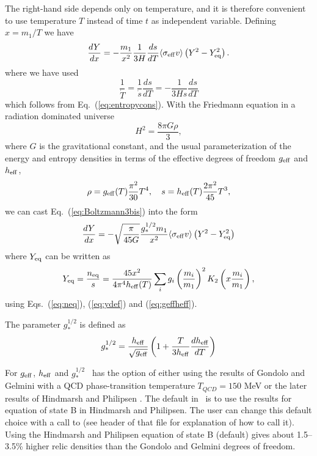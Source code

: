 The right-hand side depends only on temperature, and it is therefore
convenient to use temperature $T$ instead of time $t$ as independent
variable. Defining $x=m_1/T$ we have
\begin{equation}
  \frac{dY}{dx} = - \frac{m_{1}}{x^2} \frac{1}{3H} \frac{ds}{dT}
  \langle \sigma_{\rm{eff}} v \rangle \left( Y^2 -
  Y_{\rm{eq}}^2 \right).
\label{eq:Boltzmann3bis}
\end{equation}
where we have used
\begin{equation}
  \frac{1}{\dot{T}} = \frac{1}{\dot{s}} \frac{ds}{dT} = -
  \frac{1}{3Hs} \frac{ds}{dT} 
\end{equation} 
which follows from Eq.~(\ref{eq:entropycons}). 
With the Friedmann equation in a radiation dominated universe
\begin{equation}
  H^2 = \frac{8\pi G \rho}{3} ,
\end{equation}
where $G$ is the gravitational constant, and the
usual parameterization of the energy and entropy densities
in terms of the effective degrees of freedom $g_{\rm{eff}}$ and
$h_{\rm{eff}}$, \begin{equation} \label{eq:geffheff}
  \rho = g_{\rm{eff}}(T) \frac{\pi^2}{30} T^4
  , \quad 
  s = h_{\rm{eff}}(T) \frac{2\pi^2}{45} T^3 ,
\end{equation}
we can cast Eq.~(\ref{eq:Boltzmann3bis})
into the form \cite{GondoloGelmini}
\begin{equation} \label{eq:Boltzmann4}
  \frac{dY}{dx} = - \sqrt{\frac{\pi}{45G}} \frac{g_{*}^{1/2}m_1}{x^2}
  \langle \sigma_{\rm{eff}} v \rangle \left( Y^2 -
  Y_{\rm{eq}}^2 \right) 
\end{equation}
where $Y_{\rm eq}$ can be written as
\begin{equation}
  Y_{\rm{eq}} = \frac{n_{\rm{eq}}}{s} = 
  \frac{45 x^2}{4 \pi^4 h_{\rm{eff}}(T)} \sum_i g_i
  \left( \frac{m_i}{m_1} \right)^2 K_{2} \left( x 
\frac{m_{i}}{m_1}\right),
\end{equation}
using Eqs.~(\ref{eq:neq}), (\ref{eq:ydef}) and
(\ref{eq:geffheff}).

The parameter $g_{*}^{1/2}$ is defined as
\begin{equation}
  g_{*}^{1/2} = \frac{h_{\rm{eff}}}{\sqrt{g_{\rm{eff}}}}
  \left( 1+\frac{T}{3h_{\rm{eff}}} \frac{d h_{\rm{eff}}}{dT}
  \right)
\end{equation}

For $g_{\rm eff}$, $h_{\rm eff}$ and $g_*^{1/2}$ \ds\ has the option of either using the results of Gondolo and Gelmini \cite{GondoloGelmini} with a QCD phase-transition
temperature $T_{QCD} = 150 $ MeV or the later results of Hindmarsh and Philipsen \cite{hp05}. The default in \ds\ is to use the results for equation of state B in Hindmarsh and Philipsen. The user can change this default choice with a call to  (see header of that file for explanation of how to call it).
Using the Hindmarsh and Philipsen equation of state B (default) gives about 1.5--3.5\% higher relic densities than the Gondolo and Gelmini degrees of freedom.

